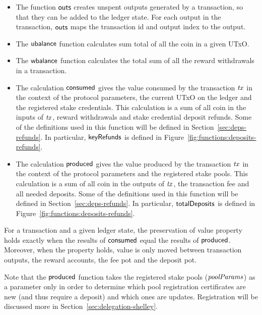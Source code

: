 \begin{itemize}

  \item
    The function $\mathsf{outs}$ creates unspent outputs generated by a transaction, so that
    they can be added to the ledger state.  For each output in the transaction,
    $\mathsf{outs}$ maps the transaction id and output index to the output.

  \item
    The $\mathsf{ubalance}$ function calculates sum total of all the coin in a given UTxO.
  \item
    The $\mathsf{wbalance}$ function calculates the total sum of all the reward withdrawals in a
    transaction.

  \item The calculation $\mathsf{consumed}$ gives the value consumed by the
    transaction $\mathit{tx}$ in the context of the protocol parameters, the
    current UTxO on the ledger and the registered stake credentials. This
    calculation is a sum of all coin in the inputs of $\mathit{tx}$, reward
    withdrawals and stake credential deposit refunds. Some of the definitions
    used in this function will be defined in Section~\ref{sec:deps-refunds}. In particular,
    $\mathsf{keyRefunds}$ is defined in Figure~\ref{fig:functions:deposits-refunds}.

  \item The calculation $\mathsf{produced}$ gives the value produced by the transaction $\mathit{tx}$
    in the context of the protocol parameters and the registered stake pools.
    This calculation is a sum of all coin in the outputs of $\mathit{tx}$,
    the transaction fee and all needed deposits.
    Some of the definitions used in this function will be defined in
    Section~\ref{sec:deps-refunds}.
    In particular, $\mathsf{totalDeposits}$ is defined in Figure~\ref{fig:functions:deposits-refunds}.
\end{itemize}

For a transaction and a given ledger state, the preservation of value property holds
exactly when the results of $\mathsf{consumed}$ equal the results of $\mathsf{produced}$.
Moreover, when the property holds, value is only moved between transaction outputs,
the reward accounts, the fee pot and the deposit pot.

Note that the $\mathsf{produced}$ function takes the registered stake pools ($\mathit{poolParams}$)
as a parameter only in order to determine which pool registration certificates are
new (and thus require a deposit) and which ones are updates.
Registration will be discussed more in Section~\ref{sec:delegation-shelley}.

